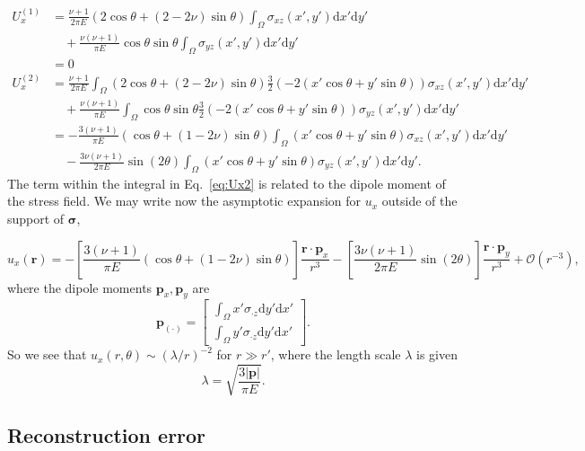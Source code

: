 \documentclass{article}
\newcommand{\dd}{\mathrm{d}}
\newcommand{\br}{\mathbf{r}}
\newcommand{\bp}{\mathbf{p}}
\begin{document}
\begin{align}
U_x^{(1)} &= \frac{\nu+1}{2\pi E} (2\cos\theta + (2-2\nu)\sin\theta) \int_\Omega \sigma_{xz}(x',y')\dd x' \dd y' \nonumber\\
&\quad+\frac{\nu(\nu+1)}{\pi E}\cos\theta\sin\theta \int_\Omega \sigma_{yz}(x',y')\dd x' \dd y' \nonumber \\
&=0 \\
U_x^{(2)} &=  \frac{\nu+1}{2\pi E}\int_\Omega (2\cos\theta + (2-2\nu)\sin\theta)\frac{3}{2}(-2(x'\cos\theta+y'\sin\theta)) \sigma_{xz}(x',y') \dd x' \dd y' \nonumber \\
&\quad+\frac{\nu(\nu+1)}{\pi E} \int_\Omega \cos\theta\sin\theta\frac{3}{2}(-2(x'\cos\theta+y'\sin\theta)) \sigma_{yz}(x',y') \dd x' \dd y' \nonumber \\
&=-\frac{3(\nu+1)}{\pi E}(\cos\theta + (1-2\nu)\sin\theta) \int_{\Omega} (x'\cos\theta + y'\sin\theta ) \sigma_{xz}(x',y') \dd x' \dd y' \nonumber \\ 
&\quad - \frac{3\nu(\nu+1)}{2\pi E}\sin(2\theta) \int_\Omega(x'\cos\theta + y'\sin\theta ) \sigma_{yz}(x',y') \dd x' \dd y' .\label{eq:Ux2}
\end{align}
 The term within the integral in Eq.~\ref{eq:Ux2} is related to the dipole moment of the stress field. We may write now the asymptotic expansion for $u_x$ outside of the support of $\boldsymbol\sigma$,

\begin{equation}
u_x(\br)  = -\left[ \frac{3(\nu+1)}{\pi E}(\cos\theta + (1-2\nu)\sin\theta) \right] \frac{\br\cdot \bp_x}{r^3} -\left[ \frac{3\nu(\nu+1)}{2\pi E}\sin(2\theta)  \right] \frac{\br\cdot \bp_y}{r^3} + \mathcal{O}(r^{-3}),
\end{equation}
%
where the dipole moments $\bp_x,\bp_y$ are
%
\begin{equation}
\bp_{(\cdot)}  = \left[ \begin{matrix} \displaystyle\int_{\Omega} x' \sigma_{\cdot z} \dd y' \dd x' \\ \displaystyle\int_{\Omega} y' \sigma_{\cdot z} \dd y' \dd x'  \end{matrix} \right].
\end{equation}
So we see that $u_x(r,\theta)\sim (\lambda/r)^{-2}$ for $r\gg r'$, where the length scale $\lambda$ is given
\begin{equation}
\lambda = \sqrt{\frac{3|\bp|}{\pi E}}.
\end{equation}


\subsection{Reconstruction error}
\end{document}
